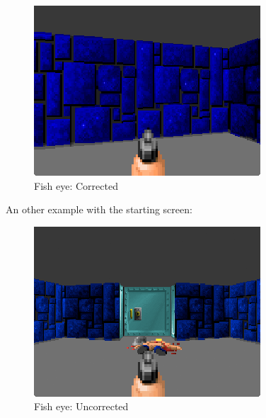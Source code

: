   \begin{figure}[H]
\centering
 \includegraphics[width=\textwidth]{imgs/fish_eye/fish_eye_corrected.png}
\caption{Fish eye: Corrected} 
 \end{figure}
 \par
 An other example with the starting screen:\\
 \par
  \begin{figure}[H]
\centering
 \includegraphics[width=\textwidth]{imgs/fish_eye/fish_eyed_start_screen2.png}
  \caption{Fish eye: Uncorrected} 
 \end{figure}
 \par


